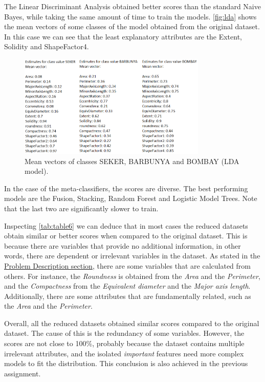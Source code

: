\documentclass[a4paper,11pt]{article}
\begin{document}
The Linear Discriminant Analysis obtained better scores than the standard Naive Bayes, while taking the same amount of time to train the models. \autoref{fig:lda} shows the mean vectors of some classes of the model obtained from the original dataset. In this case we can see that the least explanatory attributes are the Extent, Solidity and ShapeFactor4.

\begin{figure}[h]
\centering
\includegraphics[width=0.8\textwidth]{LDA}
\caption{Mean vectors of classes SEKER, BARBUNYA and BOMBAY (LDA model).}
\label{fig:lda}
\end{figure}

In the case of the meta-classifiers, the scores are diverse. The best performing models are the Fusion, Stacking, Random Forest and Logistic Model Trees. Note that the last two are significantly slower to train.

Inspecting \autoref{tab:table6} we can deduce that in most cases the reduced datasets obtain similar or better scores when compared to the original dataset. This is because there are variables that provide no additional information, in other words, there are dependent or irrelevant variables in the dataset. As stated in the \hyperref[sec:problem]{Problem Description section}, there are some variables that are calculated from others. For instance, the \textit{Roundness} is obtained from the \textit{Area} and the \textit{Perimeter}, and the \textit{Compactness} from the \textit{Equivalent diameter} and the \textit{Major axis length}. Additionally, there are some attributes that are fundamentally related, such as the \textit{Area} and the \textit{Perimeter}.

Overall, all the reduced datasets obtained similar scores compared to the original dataset. The cause of this is the redundancy of some variables. However, the scores are not close to 100\%, probably because the dataset contains multiple irrelevant attributes, and the isolated \textit{important} features need more complex models to fit the distribution. This conclusion is also achieved in the previous assignment.
\end{document}
